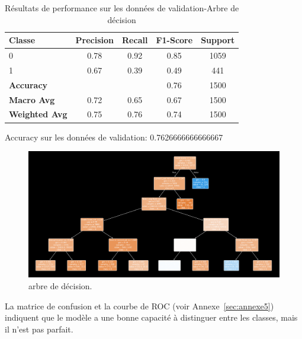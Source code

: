 \begin{table}[H]
\centering
\caption{Résultats de performance sur les données de validation-Arbre de décision}
\label{tab:performance_Arbre}
\begin{tabular}{|l|c|c|c|c|}
\hline
\textbf{Classe}     & \textbf{Precision} & \textbf{Recall} & \textbf{F1-Score} & \textbf{Support} \\ \hline
0                   & 0.78               & 0.92            & 0.85              & 1059             \\ \hline
1                   & 0.67               & 0.39            & 0.49              & 441              \\ \hline
\textbf{Accuracy}   & \multicolumn{2}{|c|}{} & 0.76 &  1500                              \\ \hline
\textbf{Macro Avg}  & 0.72               & 0.65            & 0.67              & 1500             \\ \hline
\textbf{Weighted Avg} & 0.75               & 0.76            & 0.74              & 1500             \\ \hline
\end{tabular}
\begin{flushleft}
Accuracy sur les données de validation: 0.7626666666666667
\end{flushleft}
\end{table}

\begin{figure}[H]
\centering
\includegraphics[width=1\textwidth]{figures/arbre.png}
\caption{arbre de décision.}
\label{fig:arbre_deci}
\end{figure}


\begin{flushleft}
La matrice de confusion et la courbe de ROC (voir Annexe~\ref{sec:annexe5}) indiquent que le modèle a une bonne capacité à distinguer entre les classes, mais il n'est pas parfait.
\end{flushleft}



